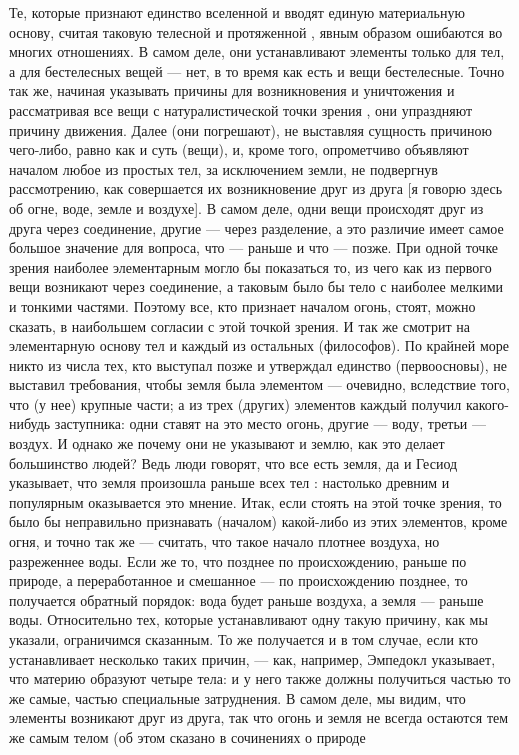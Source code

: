 \documentclass{article}
\begin{document}
Те, которые признают единство вселенной и вводят единую материальную основу, считая таковую телесной и протяженной
\footnotemark[1]
, явным образом ошибаются во многих отношениях. В самом деле, они устанавливают элементы только для тел, а для бестелесных вещей — нет, в то время как есть и вещи бестелесные. Точно так же, начиная указывать причины для возникновения и уничтожения и рассматривая все вещи с натуралистической точки зрения
\footnotemark[2]
, они упраздняют причину движения. Далее (они погрешают), не выставляя сущность причиною чего-либо, равно как и суть (вещи), и, кроме того, опрометчиво объявляют началом любое из простых тел, за исключением земли, не подвергнув рассмотрению, как совершается их возникновение друг из друга [я говорю здесь об огне, воде, земле и воздухе].
\footnotemark[3]
В самом деле, одни вещи происходят друг из друга через соединение, другие — через разделение, а это различие имеет самое большое значение для вопроса, что — раньше и что — позже. При одной точке зрения наиболее элементарным могло бы показаться то, из чего как из первого вещи возникают через соединение, а таковым было бы тело с наиболее мелкими и тонкими частями.
\footnotemark[4]
Поэтому все, кто признает началом огонь, стоят, можно сказать, в наибольшем согласии с этой точкой зрения. И так же смотрит на элементарную основу тел и каждый из остальных (философов). По крайней море никто из числа тех, кто выступал позже и утверждал единство (первоосновы), не выставил требования, чтобы земля была элементом — очевидно, вследствие того, что (у нее) крупные части; а из трех (других) элементов каждый получил какого-нибудь заступника: одни ставят на это место огонь, другие — воду, третьи — воздух. И однако же почему они не указывают и землю, как это делает большинство людей? Ведь люди говорят, что все есть земля, да и Гесиод указывает, что земля произошла раньше всех тел
\footnotemark[5]
: настолько древним и популярным
\footnotemark[6]
оказывается это мнение. Итак, если стоять на этой точке зрения, то было бы неправильно признавать (началом) какой-либо из этих элементов, кроме огня, и точно так же — считать, что такое начало плотнее воздуха, но разреженнее воды. Если же то, что позднее по происхождению, раньше по природе, а переработанное и смешанное — по происхождению позднее, то получается обратный порядок: вода будет раньше воздуха, а земля — раньше воды. Относительно тех, которые устанавливают одну такую причину, как мы указали, ограничимся сказанным. То же получается и в том случае, если кто устанавливает несколько таких причин, — как, например, Эмпедокл указывает, что материю образуют четыре тела: и у него также должны получиться частью то же самые, частью специальные затруднения. В самом деле, мы видим, что элементы возникают друг из друга, так что огонь и земля не всегда остаются тем же самым телом (об этом сказано в сочинениях о природе
\end{document}
